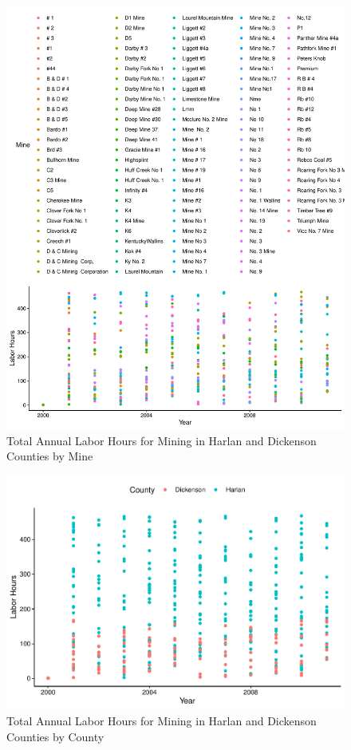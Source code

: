 \documentclass[12pt,]{article}
\begin{document}
\begin{figure}
\centering
\includegraphics{Smith_ENV872_Project_files/figure-latex/unnamed-chunk-6-1.pdf}
\caption{\label{fig:figs} Total Annual Labor Hours for Mining in Harlan
and Dickenson Counties by Mine}
\end{figure}

\begin{figure}
\centering
\includegraphics{Smith_ENV872_Project_files/figure-latex/unnamed-chunk-7-1.pdf}
\caption{\label{fig:figs} Total Annual Labor Hours for Mining in Harlan
and Dickenson Counties by County}
\end{figure}
\end{document}
